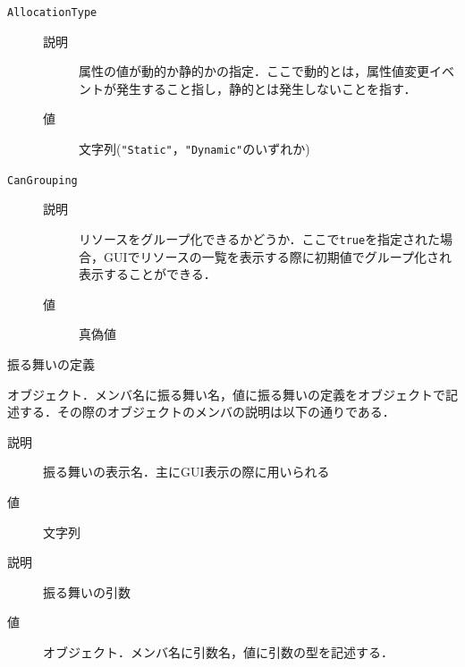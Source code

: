 \begin{description}
\begin{description}
\begin{description}
            \item[\texttt{AllocationType}] \mbox{}
            \vspace{-0.25zw}
                \begin{description}
                \item[説明] 属性の値が動的か静的かの指定．ここで動的とは，属性値変更イベントが発生すること指し，静的とは発生しないことを指す．
                \item[値] 文字列(\verb|"Static"|，\verb|"Dynamic"|のいずれか)
                \end{description}
            \item[\texttt{CanGrouping}] \mbox{}
            \vspace{-0.25zw}
                \begin{description}
                \item[説明] リソースをグループ化できるかどうか．ここで\verb|true|を指定された場合，GUIでリソースの一覧を表示する際に初期値でグループ化され表示することができる．
                \item[値] 真偽値
                \end{description}
            \end{description}
    \end{description}
\item[\texttt{Behaviors}] \mbox{}
    \vspace{-1zw}
    \begin{description}
    \setlength{\itemsep}{-1.5\itemsep}
    \item[説明] 振る舞いの定義
    \item[値] オブジェクト．メンバ名に振る舞い名，値に振る舞いの定義をオブジェクトで記述する．その際のオブジェクトのメンバの説明は以下の通りである．
            \begin{description}
            \setlength{\itemsep}{-1.5\itemsep}
            \item[\texttt{DisplayName}] \mbox{}
            \vspace{-0.25zw}
                \begin{description}
                \item[説明] 振る舞いの表示名．主にGUI表示の際に用いられる
                \item[値] 文字列
                \end{description}
            \item[\texttt{Arguments}] \mbox{}
            \vspace{-0.25zw}
                \begin{description}
                \item[説明] 振る舞いの引数
                \item[値] オブジェクト．メンバ名に引数名，値に引数の型を記述する．
                \end{description}
            \end{description}
    \end{description}
\end{description}

